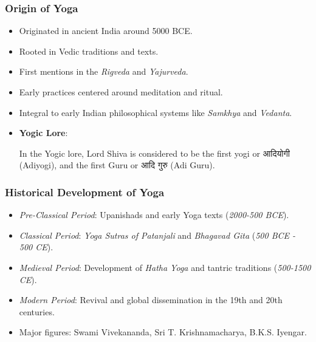 \begin{frame}[fragile]\frametitle{Origin of Yoga}

      \begin{itemize}
		\item Originated in ancient India around 5000 BCE.
		\item Rooted in Vedic traditions and texts.
		\item First mentions in the \textit{Rigveda} and \textit{Yajurveda}.
		\item Early practices centered around meditation and ritual.
		\item Integral to early Indian philosophical systems like \textit{Samkhya} and \textit{Vedanta}.
          
          
          
          
        \item \textbf{Yogic Lore}: 
          
          In the Yogic lore, Lord Shiva is considered to be the first yogi or आदियोगी (Adiyogi), and the first Guru or आदि गुरु (Adi Guru).
          		
	  \end{itemize}

\end{frame}

\begin{frame}[fragile]\frametitle{Historical Development of Yoga}

      \begin{itemize}
		\item \textit{Pre-Classical Period}: Upanishads and early Yoga texts (\textit{2000-500 BCE}).
		\item \textit{Classical Period}: \textit{Yoga Sutras of Patanjali} and \textit{Bhagavad Gita} (\textit{500 BCE - 500 CE}).
		\item \textit{Medieval Period}: Development of \textit{Hatha Yoga} and tantric traditions (\textit{500-1500 CE}).
		\item \textit{Modern Period}: Revival and global dissemination in the 19th and 20th centuries.
		\item Major figures: Swami Vivekananda, Sri T. Krishnamacharya, B.K.S. Iyengar.
	  \end{itemize}

\end{frame}

